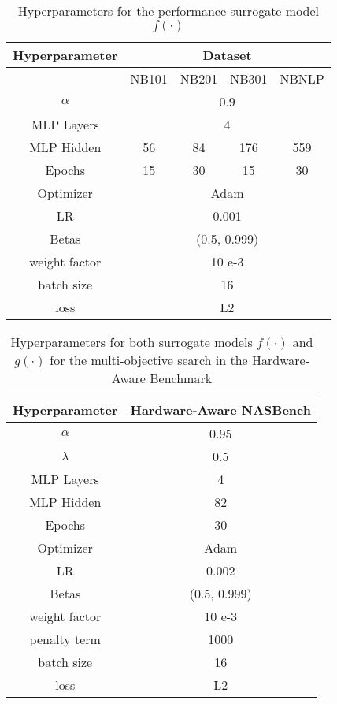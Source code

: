 \documentclass[runningheads]{llncs}
\begin{document}
\begin{table}[h]
	\scriptsize
	\centering
	\caption{Hyperparameters for the performance surrogate model $f(\cdot)$}\label{table:HP_simple_surrogate}
	\begin{tabular}{c ||ccc c}
		\toprule
		Hyperparameter      & \multicolumn{4}{c}{Dataset}  \\
		\midrule
		& NB101    & NB201   & NB301 & NBNLP   \\
		\midrule
		$\alpha$              &    \multicolumn{4}{c}{0.9} \\       
		MLP Layers          &    \multicolumn{4}{c}{4}     \\
		MLP Hidden          &      56 & 84  & 176 & 559   \\
		Epochs              &    15      &  30 &  15 &  30  \\
		Optimizer           &   \multicolumn{4}{c}{Adam \cite{2015ADAM}}   \\
		LR                  & \multicolumn{4}{c}{0.001} \\     
		Betas               & \multicolumn{4}{c}{(0.5, 0.999)} \\
		weight factor       &    \multicolumn{4}{c}{10 e-3}   \\
		batch size          &   \multicolumn{4}{c}{16}  \\
		loss          &      \multicolumn{4}{c}{L2} \\
		\bottomrule
		
	\end{tabular}
\end{table}


\begin{table}[h]
	\scriptsize
	\centering
	\caption{Hyperparameters for both surrogate models $f(\cdot)$ and $g(\cdot)$ for the multi-objective search in the Hardware-Aware Benchmark}\label{table:HP_multi_surrogate}
	\begin{tabular}{c || c}
		\toprule
		
		Hyperparameter      & Hardware-Aware NASBench \\
		\midrule
		$\alpha$               &   0.95  \\  
		$\lambda$            & 0.5 \\
		MLP Layers          &       4      \\
		MLP Hidden          &      82    \\
		Epochs              &      30  \\
		Optimizer           &    Adam  \cite{2015ADAM}   \\
		LR                  &   0.002 \\     
		Betas               &  (0.5, 0.999) \\
		weight factor       &     10 e-3 \\
		penalty term         & 1000 \\
		batch size          &     16 \\
		loss                & L2\\
		\bottomrule
		
	\end{tabular}
\end{table}
\end{document}
